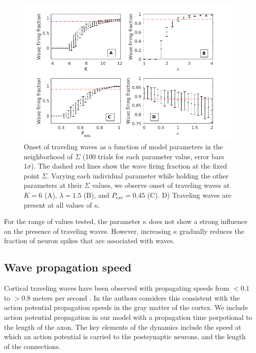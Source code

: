 \documentclass[12pt]{article}
\begin{document}
\begin{figure}[!htb]
 \centering
 \includegraphics[width=\textwidth]{fig/ParamWaveSim}
 \caption{Onset of traveling waves as a function of model parameters in the neighborhood of $\Sigma$ (100 trials for each parameter value, error bars $1\sigma$). 
         The dashed red lines show the wave firing fraction at the fixed point $\Sigma$.  
         Varying each individual parameter while holding the other parameters at their $\Sigma$ values, we observe onset of traveling waves at $K=6$ (A), $\lambda=1.5$ (B), and $P_{exc}=0.45$ (C).  
         D) Traveling waves are present at all values of $\kappa$. }
 \label{fig:wave_parameters}
\end{figure}

\FloatBarrier

For the range of values tested, the parameter $\kappa$ does not show a strong influence on the presence of traveling waves. 
However, increasing $\kappa$ gradually reduces the fraction of neuron spikes that are associated with waves.

\subsection{Wave propagation speed} \label{sub:propagation_speed}
Cortical traveling waves have been observed with propagating speeds from $<0.1$ to $>0.8$ meters per second \parencite{Sato2012}\parencite{Golomb1997}\parencite{Chervin1988}.
In \parencite{Muller2018} the authors considers this consistent with the action potential propagation speeds in the gray matter of the cortex. 
We include action potential propagation in our model with a propagation time porpotional to the length of the axon.
The key elements of the dynamics include the speed at which an action potential is carried to the postsynaptic neurons, and the length of the connections.
\end{document}
